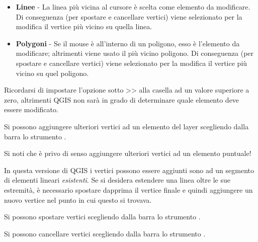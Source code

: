 \begin{itemize}
\item \textbf{Linee}    - La linea più vicina al cursore è scelta come
                          elemento da modificare.
                          Di conseguenza (per spostare e cancellare vertici)
                          viene selezionato per la modifica il vertice
                          più vicino su quella linea.

\item \textbf{Polygoni} - Se il mouse è all'interno di un poligono, esso è
                          l'elemento da modificare; altrimenti viene usato il più vicino
			  poligono.
                          Di conseguenza (per spostare e cancellare vertici)
                          viene selezionato per la modifica il vertice più
			  vicino su quel poligono.
\end{itemize}

Ricordarsi di impostare l'opzione sotto
>>
alla casella 
ad un valore superiore a zero, altrimenti QGIS non sarà in grado di
determinare quale elemento deve essere modificato.



Si possono aggiungere ulteriori vertici ad un elemento del layer scegliendo
dalla barra lo strumento .

Si noti che è privo di senso aggiungere ulteriori vertici ad un elemento
puntuale!

In questa versione di QGIS i vertici possono essere aggiunti sono ad un
segmento di elementi lineari \textit{esistenti}. Se si desidera estendere una
linea oltre le sue estremità, è necessario spostare dapprima il vertice finale
e quindi aggiungere un nuovo vertice nel punto in cui questo si trovava.


Si possono spostare vertici scegliendo dalla barra lo strumento .


Si possono cancellare vertici scegliendo dalla barra lo strumento .

